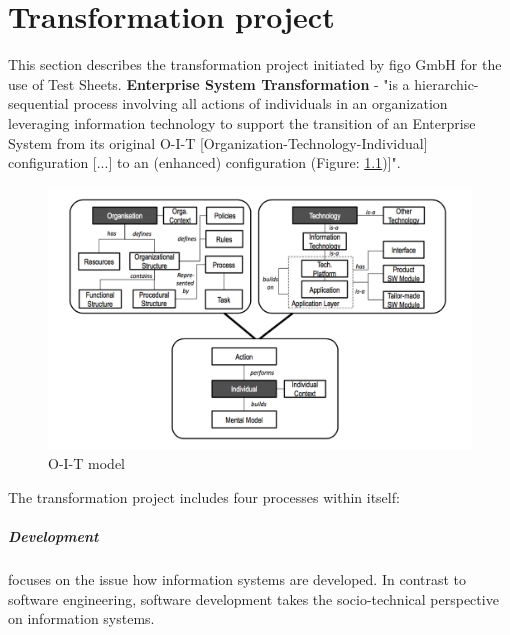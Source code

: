 
\chapter{Transformation project}
\label{sec:transP}
This section describes the transformation project initiated by figo GmbH for the use of Test Sheets.
\textbf{Enterprise System Transformation} -  "is a hierarchic-sequential process involving all actions of individuals in an organization leveraging information technology to support the transition of an Enterprise System from its original O-I-T [Organization-Technology-Individual] configuration [...] to an (enhanced) configuration (Figure: \ref{fig:oit})]"\cite{MES5}.

\begin{figure}[ht]
	\label{fig:oit}
	\centering
	\includegraphics[width=\textwidth]{grafiken/oit.png}
	\caption{O-I-T model\cite{MES5}}
\end{figure}

The transformation project includes four processes within itself:
\paragraph{Development} focuses on the issue how information systems are developed. In contrast to software engineering, software development takes the socio-technical perspective on information systems\cite{MES6}.


